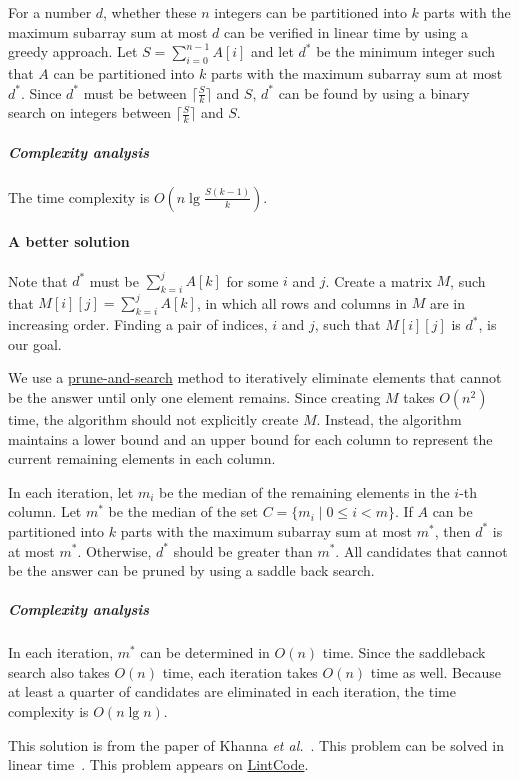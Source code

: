 \begin{Answer}
For a number $d$, whether these $n$ integers can be partitioned into $k$ parts with the maximum subarray sum at most $d$ can be verified in linear time by using a greedy approach.
Let $S = \sum_{i=0}^{n-1} A[i]$ and let $d^*$ be the minimum integer such that $A$ can be partitioned into $k$ parts with the maximum subarray sum at most $d^*$. 
Since $d^*$ must be between $\lceil \frac{S}{k} \rceil$ and $S$, $d^*$ can be found by using a binary search on integers between $\lceil \frac{S}{k} \rceil$ and $S$.
\subparagraph{Complexity analysis} The time complexity is $O(n \lg \frac{S(k-1)}{k})$.

\paragraph{A better solution}  Note that $d^*$ must be $\sum_{k=i}^j A[k]$ for some $i$ and $j$.
Create a matrix $M$, such that $M[i][j] = \sum_{k=i}^j A[k]$, in which all rows and columns in $M$ are in increasing order.
Finding a pair of indices, $i$ and $j$, such that $M[i][j]$ is $d^*$, is our goal.

We use a \href{https://en.wikipedia.org/wiki/Prune_and_search}{prune-and-search} method to iteratively eliminate elements that cannot be the answer until only one element remains.
Since creating $M$ takes $O(n^2)$ time, the algorithm should not explicitly create $M$.
Instead, the algorithm maintains a lower bound and an upper bound for each column to represent the current remaining elements in each column.

In each iteration, let $m_i$ be the median of the remaining elements in the $i$-th column.
Let $m^*$ be the median of the set $C = \{ m_i \mid 0 \leq i < m \}$.
If $A$ can be partitioned into $k$ parts with the maximum subarray sum at most $m^*$, then $d^*$ is at most $m^*$.
Otherwise, $d^*$ should be greater than $m^*$.
All candidates that cannot be the answer can be pruned by using a saddle back search.

\subparagraph{Complexity analysis} In each iteration, $m^*$ can be determined in $O(n)$ time. 
Since the saddleback search also takes $O(n)$ time, each iteration takes $O(n)$ time as well. 
Because at least a quarter of candidates are eliminated in each iteration, the time complexity is $O(n \lg n)$.
\begin{remark}
This solution is from the paper of Khanna \textit{et al.}~\cite{Khanna1997}. This problem can be solved in linear time~\cite{Frederickson1991}. This problem appears on \href{http://www.lintcode.com/en/problem/copy-books/}{LintCode}.
\end{remark}
\end{Answer}

